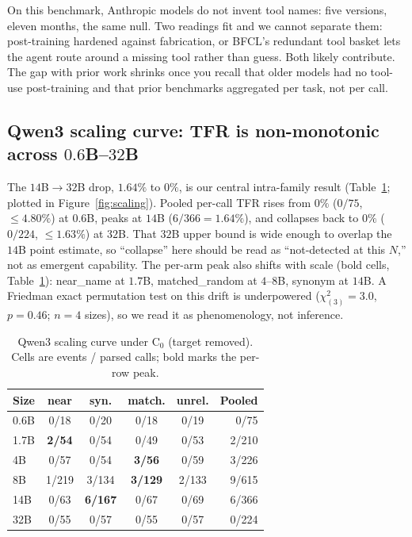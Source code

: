 On this benchmark, Anthropic models do not invent tool names: five
versions, eleven months, the same null. Two readings fit and we cannot
separate them: post-training hardened against fabrication, or BFCL's
redundant tool basket lets the agent route around a missing tool rather
than guess. Both likely contribute. The gap with prior work shrinks once
you recall that older models had no tool-use post-training and that prior
benchmarks aggregated per task, not per call.

\subsection{Qwen3 scaling curve: TFR is non-monotonic across $0.6$B--$32$B}
\label{sec:results:scaling}

The $14$B$\to\!32$B drop, $1.64\%$ to $0\%$, is our central
intra-family result (Table~\ref{tab:qwen3-scale}; plotted in
Figure~\ref{fig:scaling}). Pooled per-call TFR
rises from $0\%$ ($0/75$, $\leq\!4.80\%$) at $0.6$B, peaks at $14$B
($6/366=1.64\%$), and collapses back to $0\%$ ($0/224$,
$\leq\!1.63\%$) at $32$B. That $32$B upper bound is wide enough to
overlap the $14$B point estimate, so ``collapse'' here should be read
as ``not-detected at this $N$,'' not as emergent capability. The per-arm
peak also shifts with scale (bold cells, Table~\ref{tab:qwen3-scale}):
near\_name at $1.7$B, matched\_random at $4$--$8$B, synonym at $14$B. A
Friedman exact permutation test on this drift is underpowered
($\chi^2_{(3)}\!=\!3.0$, $p\!=\!0.46$; $n\!=\!4$ sizes), so we read it as
phenomenology, not inference.



\begin{table}[t]
\caption{Qwen3 scaling curve under $\mathrm{C}_0$ (target removed).
Cells are events / parsed calls; bold marks the per-row peak.}
\label{tab:qwen3-scale}
\centering
\small
\setlength{\tabcolsep}{4pt}
\begin{tabular}{lccccr}
\toprule
Size & near & syn. & match. & unrel. & Pooled \\
\midrule
0.6B  & 0/18 & 0/20 & 0/18 & 0/19 & 0/75 \\
1.7B  & \textbf{2/54} & 0/54 & 0/49 & 0/53 & 2/210 \\
4B    & 0/57 & 0/54 & \textbf{3/56} & 0/59 & 3/226 \\
8B    & 1/219 & 3/134 & \textbf{3/129} & 2/133 & 9/615 \\
14B   & 0/63 & \textbf{6/167} & 0/67 & 0/69 & 6/366 \\
32B   & 0/55 & 0/57 & 0/55 & 0/57 & 0/224 \\
\bottomrule
\end{tabular}
\end{table}

